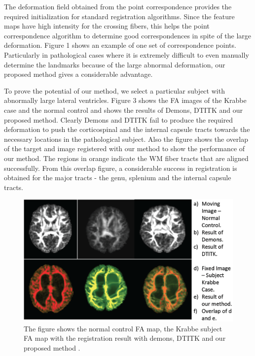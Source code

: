 \documentclass[]{spie}  %
\begin{document}
The deformation field obtained from the point correspondence provides the required initialization for standard registration algorithms. Since the feature maps have high intensity for the crossing fibers, this helps the point correspondence algorithm to determine good correspondences in spite of the large deformation. Figure 1 shows an example of one set of correspondence points. Particularly in pathological cases where it is extremely difficult to even manually determine the landmarks because of the large abnormal deformation, our proposed method gives a considerable advantage.

To prove the potential of our method, we select a particular subject with abnormally large lateral ventricles. Figure 3 shows the FA images of the Krabbe case and the normal control and shows the results of Demons, DTITK and our proposed method. Clearly Demons and DTITK fail to produce the required deformation to push the corticospinal and the internal capsule tracts towards the necessary locations in the pathological subject. Also the figure shows the overlap of the target and image registered with our method to show the performance of our method. The regions in orange indicate the WM fiber tracts that are aligned successfully. From this overlap figure, a considerable success in registration is obtained for the major tracts - the genu, splenium and the internal capsule tracts.
\begin{figure}[t]
\label{fig:RegResult}
\includegraphics[width=1.0\columnwidth]{images/RegResult.png}
\centering
\caption{The figure shows the normal control FA map, the Krabbe subject FA map with the registration result with demons, DTITK and our proposed method . }
\end{figure}
\end{document}
